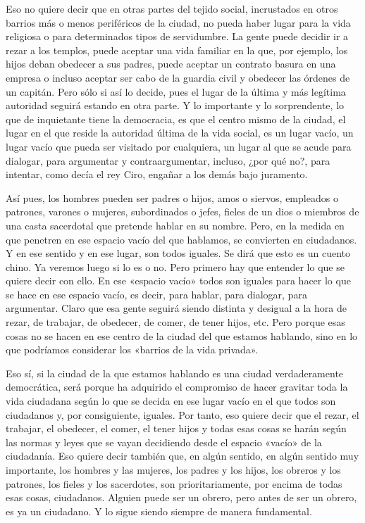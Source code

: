 \documentclass[draft,9pt,letterpaper,twocolumn,openany]{extbook}
\newcommand{\notar}[1]{\marginnote{\small\sffamily #1}[-.8em]}
\begin{document}
Eso no quiere decir que en otras partes del
tejido social, incrustados en otros barrios más o menos
periféricos de la ciudad, no pueda haber lugar para la vida
religiosa o para determinados tipos de servidumbre. La
gente puede decidir ir a rezar a los templos, puede aceptar
una vida familiar en la que, por ejemplo, los hijos deban
obedecer a sus padres, puede aceptar un contrato basura
en una empresa o incluso aceptar ser cabo de la guardia
civil y obedecer las órdenes de un capitán. Pero sólo si así
lo decide, pues el lugar de la última y más legítima autoridad
seguirá estando en otra parte. Y lo importante y lo
sorprendente, lo que de inquietante tiene la democracia, es
que el centro mismo de la ciudad, el lugar en el que reside
la autoridad última de la vida social, es un lugar vacío, un
lugar vacío que pueda ser visitado por cualquiera, un lugar al
que se acude para dialogar, para argumentar y
contraargumentar, incluso, ¿por qué no?, para intentar, como
decía el rey Ciro, engañar a los demás bajo juramento.

Así pues, los hombres pueden ser padres o hijos, amos o
siervos, empleados o patrones, varones o mujeres,
subordinados o jefes, fieles de un dios o miembros de una
casta sacerdotal que pretende hablar en su nombre. Pero, en
la medida en que penetren en ese espacio vacío del que
hablamos, se convierten en ciudadanos. Y en ese sentido y
en ese lugar, son todos iguales. Se dirá que esto es un
cuento chino. Ya veremos luego si lo es o no. Pero primero
hay que entender lo que se quiere decir con ello. En ese
«espacio vacío» todos son iguales para hacer lo que se hace
en ese espacio vacío, es decir, para hablar, para dialogar, para
argumentar. Claro que esa gente seguirá siendo distinta y
desigual a la hora de rezar, de trabajar, de obedecer, de
comer, de tener hijos, etc. Pero porque esas cosas no se
hacen en ese centro de la ciudad del que estamos hablando,
sino en lo que podríamos considerar los «barrios de la vida
privada». 

Eso sí, si la ciudad de la que estamos hablando es
una ciudad verdaderamente democrática, será porque ha
adquirido el compromiso de hacer gravitar toda la vida
ciudadana según lo que se decida en ese lugar vacío en el
que todos son ciudadanos y, por consiguiente, iguales. Por
tanto, eso quiere decir que el rezar, el trabajar, el obedecer, el
comer, el tener hijos y todas esas cosas se harán según las
normas y leyes que se vayan decidiendo desde el espacio
«vacío» de la ciudadanía. Eso quiere decir también que, en
algún sentido, en algún sentido muy importante, los hombres
y las mujeres, los padres y los hijos, los obreros y los
patrones, los fieles y los sacerdotes, son prioritariamente, por
encima de todas esas cosas, ciudadanos. Alguien puede ser
un obrero, pero antes de ser un obrero, es ya un ciudadano. Y
lo sigue siendo siempre de manera fundamental. 
\end{document}
